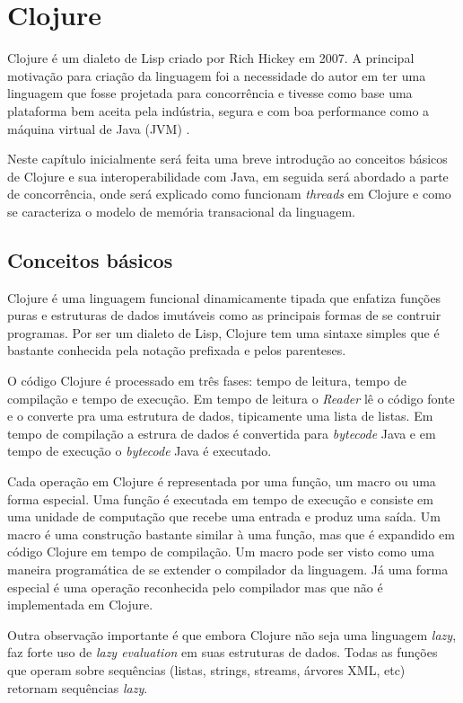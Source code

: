 \chapter{Clojure}

Clojure é um dialeto de Lisp criado por Rich Hickey em 2007. A principal motivação para criação da linguagem foi a necessidade do autor em ter uma linguagem que fosse projetada para concorrência e tivesse como base uma plataforma bem aceita pela indústria, segura e com boa performance como a máquina virtual de Java (JVM) \cite{hickey2010clojurerationale}.

Neste capítulo inicialmente será feita uma breve introdução ao conceitos básicos de Clojure e sua interoperabilidade com Java, em seguida será abordado a parte de concorrência, onde será explicado como funcionam \emph{threads} em Clojure e como se caracteriza o modelo de memória transacional da linguagem.


\section{Conceitos básicos}

Clojure é uma linguagem funcional dinamicamente tipada que enfatiza funções puras e estruturas de dados imutáveis como as principais formas de se contruir programas. Por ser um dialeto de Lisp, Clojure tem uma sintaxe simples que é bastante conhecida pela notação prefixada e pelos parenteses.

O código Clojure é processado em três fases: tempo de leitura, tempo de compilação e tempo de execução. Em tempo de leitura o \emph{Reader} lê o código fonte e o converte pra uma estrutura de dados, tipicamente uma lista de listas. Em tempo de compilação a estrura de dados é convertida para \emph{bytecode} Java e em tempo de execução o \emph{bytecode} Java é executado. \cite{volkmann2009stm}

Cada operação em Clojure é representada por uma função, um macro ou uma forma especial. Uma função é executada em tempo de execução e consiste em uma unidade de computação que recebe uma entrada e produz uma saída. Um macro é uma construção bastante similar à uma função, mas que é expandido em código Clojure em tempo de compilação. Um macro pode ser visto como uma maneira programática de se extender o compilador da linguagem. Já uma forma especial é uma operação reconhecida pelo compilador mas que não é implementada em Clojure.

Outra observação importante é que embora Clojure não seja uma linguagem \emph{lazy}, faz forte uso de \emph{lazy evaluation} em suas estruturas de dados. Todas as funções que operam sobre sequências (listas, strings, streams, árvores XML, etc) retornam sequências \emph{lazy}.

